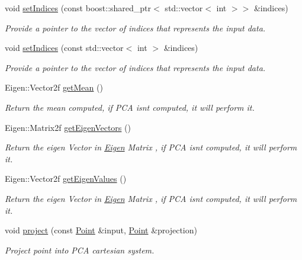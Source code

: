 \begin{DoxyCompactItemize}
void \hyperlink{classPCA2D_a4e7f046e1198928994dfc40a4c3be40e}{set\+Indices} (const boost\+::shared\+\_\+ptr$<$ std\+::vector$<$ int $>$$>$ \&indices)
\begin{DoxyCompactList}\small\item\em Provide a pointer to the vector of indices that represents the input data. \end{DoxyCompactList}\item 
void \hyperlink{classPCA2D_aa5b9ccb12b5ce673ac851a2a5c4f4f97}{set\+Indices} (const std\+::vector$<$ int $>$ \&indices)
\begin{DoxyCompactList}\small\item\em Provide a pointer to the vector of indices that represents the input data. \end{DoxyCompactList}\item 
Eigen\+::\+Vector2f \hyperlink{classPCA2D_a35ed9e55a614bb7fd87025945867cffa}{get\+Mean} ()
\begin{DoxyCompactList}\small\item\em Return the mean computed, if P\+CA isn\textquotesingle{}t computed, it will perform it. \end{DoxyCompactList}\item 
Eigen\+::\+Matrix2f \hyperlink{classPCA2D_a2243f1d03a734f7cf4f9f959f494a2e0}{get\+Eigen\+Vectors} ()
\begin{DoxyCompactList}\small\item\em Return the eigen Vector in \hyperlink{namespaceEigen}{Eigen} Matrix , if P\+CA isn\textquotesingle{}t computed, it will perform it. \end{DoxyCompactList}\item 
Eigen\+::\+Vector2f \hyperlink{classPCA2D_ace26902adea167c5aef9a3219ceafbd3}{get\+Eigen\+Values} ()
\begin{DoxyCompactList}\small\item\em Return the eigen Vector in \hyperlink{namespaceEigen}{Eigen} Matrix , if P\+CA isn\textquotesingle{}t computed, it will perform it. \end{DoxyCompactList}\item 
void \hyperlink{classPCA2D_a9768dbce5a3b9cd0b3aacbedc3301884}{project} (const \hyperlink{Normal2dEstimation_8h_ab8d898f36957cca40634530a6f118a3e}{Point} \&input, \hyperlink{Normal2dEstimation_8h_ab8d898f36957cca40634530a6f118a3e}{Point} \&projection)
\begin{DoxyCompactList}\small\item\em Project point into P\+CA cartesian system. \end{DoxyCompactList}\item 
$$
\end{DoxyCompactItemize}

